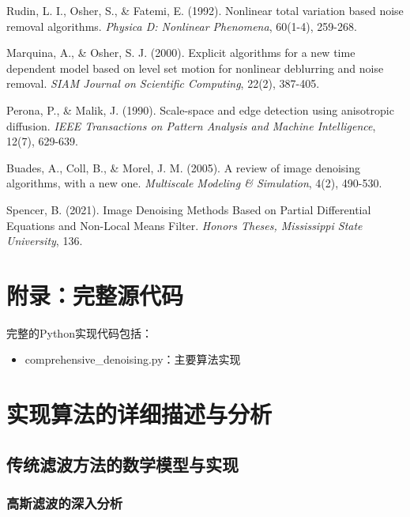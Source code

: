 \documentclass[a4paper,12pt]{ctexart}
\begin{document}
\begin{thebibliography}{99}
Rudin, L. I., Osher, S., \& Fatemi, E. (1992). Nonlinear total variation based noise removal algorithms. \textit{Physica D: Nonlinear Phenomena}, 60(1-4), 259-268.

Marquina, A., \& Osher, S. J. (2000). Explicit algorithms for a new time dependent model based on level set motion for nonlinear deblurring and noise removal. \textit{SIAM Journal on Scientific Computing}, 22(2), 387-405.

Perona, P., \& Malik, J. (1990). Scale-space and edge detection using anisotropic diffusion. \textit{IEEE Transactions on Pattern Analysis and Machine Intelligence}, 12(7), 629-639.

Buades, A., Coll, B., \& Morel, J. M. (2005). A review of image denoising algorithms, with a new one. \textit{Multiscale Modeling \& Simulation}, 4(2), 490-530.

Spencer, B. (2021). Image Denoising Methods Based on Partial Differential Equations and Non-Local Means Filter. \textit{Honors Theses, Mississippi State University}, 136.

\end{thebibliography}

\appendix
\section{附录：完整源代码}

完整的Python实现代码包括：
\begin{itemize}
    \item comprehensive\_denoising.py：主要算法实现
\end{itemize}

\section{实现算法的详细描述与分析}

\subsection{传统滤波方法的数学模型与实现}

\subsubsection{高斯滤波的深入分析}
\end{document}
